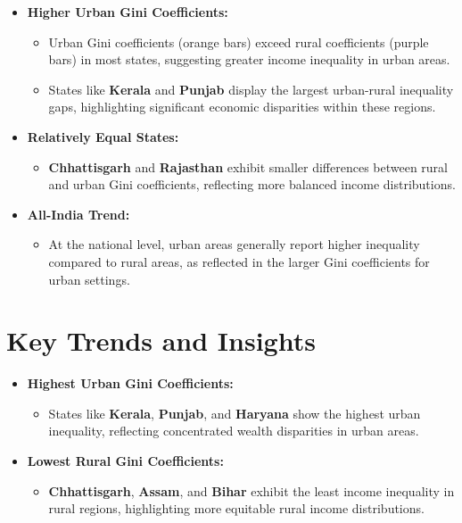 \documentclass{article}
\begin{document}
	\begin{itemize}
		\item \textbf{Higher Urban Gini Coefficients:}
		\begin{itemize}
			\item Urban Gini coefficients (orange bars) exceed rural coefficients (purple bars) in most states, suggesting greater income inequality in urban areas.
			\item States like \textbf{Kerala} and \textbf{Punjab} display the largest urban-rural inequality gaps, highlighting significant economic disparities within these regions.
		\end{itemize}
		\item \textbf{Relatively Equal States:}
		\begin{itemize}
			\item \textbf{Chhattisgarh} and \textbf{Rajasthan} exhibit smaller differences between rural and urban Gini coefficients, reflecting more balanced income distributions.
		\end{itemize}
		\item \textbf{All-India Trend:}
		\begin{itemize}
			\item At the national level, urban areas generally report higher inequality compared to rural areas, as reflected in the larger Gini coefficients for urban settings.
		\end{itemize}
	\end{itemize}
	
	\section*{Key Trends and Insights}
	\begin{itemize}
		\item \textbf{Highest Urban Gini Coefficients:}
		\begin{itemize}
			\item States like \textbf{Kerala}, \textbf{Punjab}, and \textbf{Haryana} show the highest urban inequality, reflecting concentrated wealth disparities in urban areas.
		\end{itemize}
		\item \textbf{Lowest Rural Gini Coefficients:}
		\begin{itemize}
			\item \textbf{Chhattisgarh}, \textbf{Assam}, and \textbf{Bihar} exhibit the least income inequality in rural regions, highlighting more equitable rural income distributions.
		\end{itemize}
	\end{itemize}
	
\end{document}
